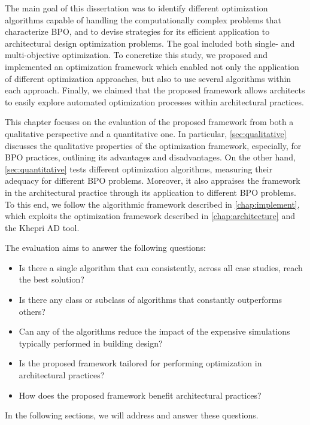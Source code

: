 \label{chap:evaluation}
 
The main goal of this dissertation was to identify different optimization algorithms capable of handling the computationally complex problems that characterize \ac{BPO}, and to devise strategies for its efficient application to architectural design optimization problems. The goal included both single- and multi-objective optimization. To concretize this study, we proposed and implemented an optimization framework which enabled not only the application of different optimization approaches, but also to use several algorithms within each approach.  Finally, we claimed that the proposed framework allows architects to easily explore automated optimization processes within architectural practices. 

This chapter focuses on the evaluation of the proposed framework from both a qualitative perspective and a quantitative one. In particular, \cref{sec:qualitative} discusses the qualitative properties of the optimization framework, especially, for \ac{BPO} practices, outlining its advantages and disadvantages. On the other hand, \cref{sec:quantitative} tests different optimization algorithms, measuring their adequacy for different \ac{BPO} problems. Moreover, it also appraises the framework in the architectural practice through its application to different \ac{BPO} problems. To this end, we follow the algorithmic framework described in \cref{chap:implement}, which exploits the optimization framework described in \cref{chap:architecture} and the Khepri \ac{AD} tool. 

The evaluation aims to answer the following questions: 
\begin{itemize}
	\item Is there a single algorithm that can consistently, across all case studies, reach the best solution?
	\item Is there any class or subclass of algorithms that constantly outperforms others?
	\item Can any of the algorithms reduce the impact of the expensive simulations typically performed in building design? 
	\item Is the proposed framework tailored for performing optimization in architectural practices? 
	\item How does the proposed framework benefit architectural practices?
\end{itemize}
In the following sections, we will address and answer these questions.

